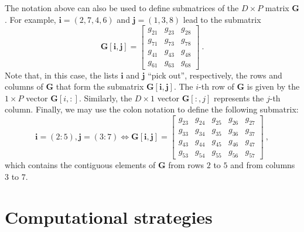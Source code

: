 The notation above can also be used to define submatrices of the $D \times P$ matrix $\mathbf{G}$. 
For example, $\mathbf{i} = (2, 7, 4, 6)$ and $\mathbf{j} = (1, 3, 8)$ lead to the submatrix
\begin{equation*}
	\mathbf{G}[\mathbf{i}, \mathbf{j}] = \begin{bmatrix}
		g_{21} & g_{23} & g_{28} \\
		g_{71} & g_{73} & g_{78} \\
		g_{41} & g_{43} & g_{48} \\
		g_{61} & g_{63} & g_{68} 
	\end{bmatrix} \: .
\end{equation*}
Note that, in this case, the lists $\mathbf{i}$ and $\mathbf{j}$ ``pick out'', respectively, the rows and columns
of $\mathbf{G}$ that form the submatrix $\mathbf{G}[\mathbf{i}, \mathbf{j}]$.
The $i$-th row of $\mathbf{G}$ is given by the $1 \times P$ vector $\mathbf{G}[i,:]$.
Similarly, the $D \times 1$ vector $\mathbf{G}[:,j]$ represents the $j$-th column.
Finally, we may use the colon notation to define the following submatrix:
\begin{equation*}
	\mathbf{i} = (2:5), \mathbf{j} = (3:7) \Leftrightarrow
	\mathbf{G}[\mathbf{i},\mathbf{j}] = \begin{bmatrix}
		g_{23} & g_{24} & g_{25} & g_{26} & g_{27} \\
		g_{33} & g_{34} & g_{35} & g_{36} & g_{37} \\
		g_{43} & g_{44} & g_{45} & g_{46} & g_{47} \\
		g_{53} & g_{54} & g_{55} & g_{56} & g_{57}
	\end{bmatrix} \: ,
\end{equation*}
which contains the contiguous elements of $\mathbf{G}$ from rows $2$ to $5$ and from columns
$3$ to $7$.

\section{Computational strategies}

